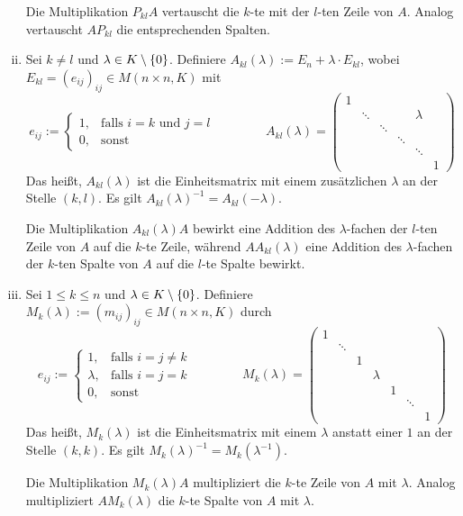\begin{definition}[Elementarmatrizen]
\begin{enumerate}[(i)]
		Die Multiplikation $P_{kl} A$ vertauscht die $k$-te mit der $l$-ten Zeile von $A$.
		Analog vertauscht $A P_{kl}$ die entsprechenden Spalten.
		\item Sei $k \neq l$ und $\lambda \in K \setminus \{0\}$.
		Definiere $A_{kl}(\lambda) := E_n + \lambda \cdot E_{kl}$, wobei $E_{kl} = (e_{ij})_{ij} \in M(n \times n,K)$ mit
		\[ e_{ij} := \begin{cases}
			1, & \text{falls } i = k \text{ und } j=l \\
			0, & \text{sonst}
			\end{cases} \qquad \qquad
		A_{kl}(\lambda) =
		\begin{pmatrix}
			1 &  &  &  &  &  \\ 
			& \ddots &  &  & \lambda &  \\ 
			&  & \ddots &  &  &  \\ 
			&  &  & \ddots &  &  \\ 
			&  &  &  & \ddots &  \\ 
			&  &  &  &  & 1
		\end{pmatrix} 
		\]
		Das heißt, $A_{kl}(\lambda)$ ist die Einheitsmatrix mit einem zusätzlichen $\lambda$ an der Stelle $(k,l)$.
		Es gilt $A_{kl}(\lambda)^{-1} = A_{kl}(-\lambda)$.
		
		Die Multiplikation $A_{kl}(\lambda) A$ bewirkt eine Addition des $\lambda$-fachen der $l$-ten Zeile von $A$ auf die $k$-te Zeile, während $A A_{kl}(\lambda)$ eine Addition des $\lambda$-fachen der $k$-ten Spalte von $A$ auf die $l$-te Spalte bewirkt.		
		\item Sei $1 \leq k \leq n$ und $\lambda \in K \setminus \{0\}$. 
		Definiere $M_k(\lambda) := (m_{ij})_{ij} \in M(n \times n,K)$ durch
		\[ e_{ij} := \begin{cases}
			1, & \text{falls } i = j \neq k \\
			\lambda, & \text{falls } i=j=k \\
			0, & \text{sonst}
		\end{cases} \qquad \qquad
		M_{k}(\lambda) =
			\begin{pmatrix}
			1 &  &  &  &  &  &  \\ 
			& \ddots &  &  &  &  &  \\ 
			&  & 1 &  &  &  &  \\ 
			&  &  & \lambda &  &  &  \\ 
			&  &  &  & 1 &  &  \\ 
			&  &  &  &  & \ddots &  \\ 
			&  &  &  &  &  & 1
			\end{pmatrix} 
		\]
		Das heißt, $M_k(\lambda)$ ist die Einheitsmatrix mit einem $\lambda$ anstatt einer $1$ an der Stelle $(k,k)$.
		Es gilt $M_k(\lambda)^{-1} = M_k(\lambda^{-1})$.
		
		Die Multiplikation $M_{k}(\lambda) A$ multipliziert die $k$-te Zeile von $A$ mit $\lambda$.
		Analog multipliziert $A M_{k}(\lambda)$ die $k$-te Spalte von $A$ mit $\lambda$.
	\end{enumerate}
\end{definition}

